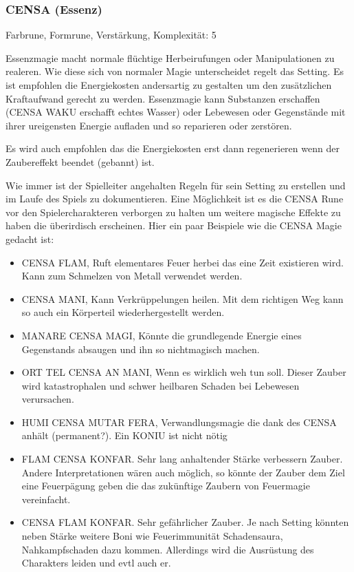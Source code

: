 \documentclass{article}
\begin{document}
\subsubsection{CENSA (Essenz)}

Farbrune, Formrune, Verstärkung, Komplexität: 5

Essenzmagie macht normale flüchtige Herbeirufungen oder Manipulationen zu realeren. Wie diese sich von normaler
Magie unterscheidet regelt das Setting. Es ist empfohlen die Energiekosten andersartig zu gestalten um den
zusätzlichen Kraftaufwand gerecht zu werden. Essenzmagie kann Substanzen erschaffen (CENSA WAKU erschafft echtes
Wasser) oder Lebewesen oder Gegenstände mit ihrer ureigensten Energie aufladen und so reparieren oder zerstören.

Es wird auch empfohlen das die Energiekosten erst dann regenerieren wenn der Zaubereffekt beendet (gebannt) ist.

Wie immer ist der Spielleiter angehalten Regeln für sein Setting zu erstellen und im Laufe des Spiels zu dokumentieren.
Eine Möglichkeit ist es die CENSA Rune vor den Spielercharakteren verborgen zu halten um weitere magische Effekte
zu haben die überirdisch erscheinen. Hier ein paar Beispiele wie die CENSA Magie gedacht ist:

\begin{itemize}
\item CENSA FLAM, Ruft elementares Feuer herbei das eine Zeit existieren wird. Kann zum Schmelzen von Metall verwendet werden.
\item CENSA MANI, Kann Verkrüppelungen heilen. Mit dem richtigen Weg kann so auch ein Körperteil wiederhergestellt werden.
\item MANARE CENSA MAGI, Könnte die grundlegende Energie eines Gegenstands absaugen und ihn so nichtmagisch machen.
\item ORT TEL CENSA AN MANI, Wenn es wirklich weh tun soll. Dieser Zauber wird katastrophalen und schwer heilbaren Schaden bei Lebewesen verursachen.
\item HUMI CENSA MUTAR FERA, Verwandlungsmagie die dank des CENSA anhält (permanent?). Ein KONIU ist nicht nötig
\item FLAM CENSA KONFAR. Sehr lang anhaltender Stärke verbessern Zauber. Andere Interpretationen wären auch möglich, so könnte der Zauber dem Ziel eine Feuerpägung geben die das zukünftige Zaubern von Feuermagie vereinfacht.
\item CENSA FLAM KONFAR. Sehr gefährlicher Zauber. Je nach Setting könnten neben Stärke weitere Boni wie Feuerimmunität Schadensaura, Nahkampfschaden dazu kommen. Allerdings wird die Ausrüstung des Charakters leiden und evtl auch er.
\end{itemize}
\end{document}
